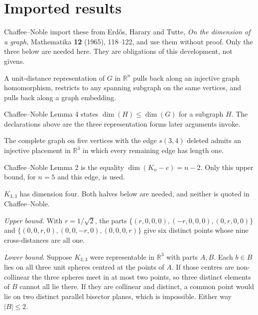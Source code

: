 \section{Imported results}

Chaffee--Noble import these from Erd\H{o}s, Harary and Tutte, \emph{On the dimension of a graph},
Mathematika \textbf{12} (1965), 118--122, and use them without proof. Only the three below are
needed here. They are obligations of this development, not givens.

\begin{lemma}
  \label{lem:monotone}
  \leanok
  A unit-distance representation of $G$ in $\mathbb{R}^n$ pulls back along an injective
  graph homomorphism, restricts to any spanning subgraph on the same vertices, and pulls
  back along a graph embedding.

  Chaffee--Noble Lemma 4 states $\dim(H) \le \dim(G)$ for a subgraph $H$. The declarations
  above are the three representation forms later arguments invoke.
\end{lemma}

\begin{lemma}
  \label{lem:kn-minus-e}
  \leanok
  The complete graph on five vertices with the edge $s(3, 4)$ deleted admits an injective
  placement in $\mathbb{R}^3$ in which every remaining edge has length one.

  Chaffee--Noble Lemma 2 is the equality $\dim(K_n - e) = n - 2$. Only this upper bound,
  for $n = 5$ and this edge, is used.
\end{lemma}

\begin{lemma}[$\dim(K_{3,3}) = 4$; EHT via Chaffee--Noble Lemma 3]
  \label{lem:k33-dim}
  \leanok
  $K_{3,3}$ has dimension four. Both halves below are needed, and neither is quoted in
  Chaffee--Noble.

  \emph{Upper bound.} With $r = 1/\sqrt{2}$, the parts
  $\{(r,0,0,0), (-r,0,0,0), (0,r,0,0)\}$ and $\{(0,0,r,0), (0,0,-r,0), (0,0,0,r)\}$ give six
  distinct points whose nine cross-distances are all one.

  \emph{Lower bound.} Suppose $K_{3,3}$ were representable in $\mathbb{R}^3$ with parts $A, B$.
  Each $b \in B$ lies on all three unit spheres centred at the points of $A$. If those centres are
  non-collinear the three spheres meet in at most two points, so three distinct elements of $B$
  cannot all lie there. If they are collinear and distinct, a common point would lie on two
  distinct parallel bisector planes, which is impossible. Either way $\lvert B\rvert \le 2$.
\end{lemma}

